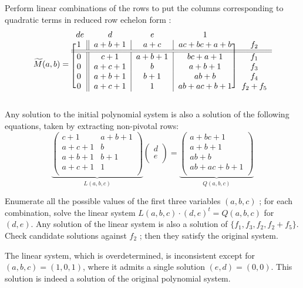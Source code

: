 \documentclass[a4paper,UKenglish,cleveref, autoref]{lipics-v2019}
\begin{document}
Perform linear combinations of the rows to put the columns corresponding to
quadratic terms in reduced row echelon form :
\[
  \widetilde M(a,b) = \begin{blockarray}{ccccc}
  de & d & e & 1 & \\
  \begin{block}{[c||c|c|c]c}
    1 & a+b+1 & a+c     & ac +bc+a+b & f_2\\
    \BAhline\BAhline
    0 & c+1 & a+b+1 & bc + a + 1 & f_1\\
    0 & a+c+1 & b & a+b+1          & f_3 \\
    0 & a+b+1 & b+1 & ab+b  & f_4 \\
    0 & a+c+1 & 1 & ab+ac +b+1 & f_2 + f_5 \\
  \end{block}
\end{blockarray}
\]


Any solution to the initial polynomial system is also a solution of the
following equations, taken by extracting non-pivotal rows:
\[
  \underbrace{\begin{pmatrix}
    c+1   & a+b+1 \\
    a+c+1 & b     \\
    a+b+1 & b+1   \\
    a+c+1 & 1     \\
  \end{pmatrix}}_{L(a,b,c)}
  \begin{pmatrix}
    d \\
    e\\
  \end{pmatrix}
  =
  \underbrace{\begin{pmatrix}
  a + bc + 1 \\       
  a + b + 1 \\  
  ab + b  \\             
  ab + ac + b + 1 \\
\end{pmatrix}}_{Q(a,b,c)}
\]

Enumerate all the possible values of the first three variables $(a, b, c)$ ; for
each combination, solve the linear system $L(a,b,c) \cdot (d,e)^t = Q(a,b,c)$
for $(d,e)$. Any solution of the linear system is also a solution of
$\{f_1, f_3, f_2, f_2 + f_5\}$. Check candidate solutions against $f_2$ ; then
they satisfy the original system.

The linear system, which is overdetermined, is inconsistent except for
$(a,b,c) = (1,0,1)$, where it admits a single solution $(e, d) = (0, 0)$. This
solution is indeed a solution of the original polynomial system.
\end{document}
